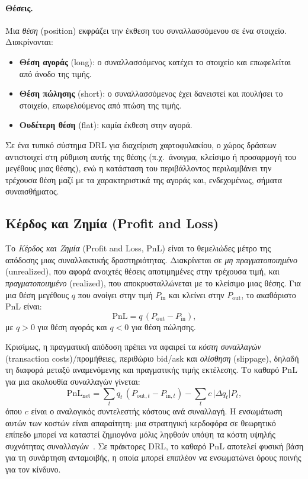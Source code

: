 \paragraph{Θέσεις.}
Μια \emph{θέση} (position) εκφράζει την έκθεση του
συναλλασσόμενου σε ένα στοιχείο. Διακρίνονται:
\begin{itemize}
    \item \textbf{Θέση αγοράς} (long): ο
    συναλλασσόμενος κατέχει το στοιχείο και επωφελείται από άνοδο της τιμής.
    \item \textbf{Θέση πώλησης} (short): ο
    συναλλασσόμενος έχει δανειστεί και πουλήσει το στοιχείο, επωφελούμενος από
    πτώση της τιμής.
    \item \textbf{Ουδέτερη θέση} (flat): καμία
    έκθεση στην αγορά.
\end{itemize}
Σε ένα τυπικό σύστημα DRL για διαχείριση χαρτοφυλακίου, ο χώρος δράσεων
αντιστοιχεί στη ρύθμιση αυτής της θέσης (π.χ.\ άνοιγμα, κλείσιμο ή προσαρμογή
του μεγέθους μιας θέσης), ενώ η κατάσταση του περιβάλλοντος περιλαμβάνει την
τρέχουσα θέση μαζί με τα χαρακτηριστικά της αγοράς και, ενδεχομένως, σήματα
συναισθήματος.


\subsection{Κέρδος και Ζημία (Profit and Loss)}
\label{subsec:pnl}

Το \emph{Κέρδος και Ζημία} (Profit and Loss, PnL)
είναι το θεμελιώδες μέτρο της απόδοσης μιας συναλλακτικής δραστηριότητας.
Διακρίνεται σε \emph{μη πραγματοποιημένο}
(unrealized), που αφορά ανοιχτές θέσεις
αποτιμημένες στην τρέχουσα τιμή, και \emph{πραγματοποιημένο}
(realized), που αποκρυσταλλώνεται με το κλείσιμο
μιας θέσης. Για μια θέση μεγέθους $q$ που ανοίγει στην τιμή $P_{\mathrm{in}}$
και κλείνει στην $P_{\mathrm{out}}$, το ακαθάριστο PnL είναι:
\begin{equation}
    \mathrm{PnL} = q\,(P_{\mathrm{out}} - P_{\mathrm{in}}),
    \label{eq:pnl-gross}
\end{equation}
με $q > 0$ για θέση αγοράς και $q < 0$ για θέση πώλησης.

Κρισίμως, η πραγματική απόδοση πρέπει να αφαιρεί τα \emph{κόστη συναλλαγών}
(transaction costs)/προμήθειες, περιθώριο
bid/ask και \emph{ολίσθηση}
(slippage), δηλαδή τη διαφορά μεταξύ αναμενόμενης
και πραγματικής τιμής εκτέλεσης. Το καθαρό PnL για μια ακολουθία συναλλαγών
γίνεται:
\begin{equation}
    \mathrm{PnL}_{\mathrm{net}}
    = \sum_{t} q_t\,(P_{\mathrm{out},t} - P_{\mathrm{in},t})
    - \sum_{t} c\,\lvert \Delta q_t \rvert P_t,
    \label{eq:pnl-net}
\end{equation}
όπου $c$ είναι ο αναλογικός συντελεστής κόστους ανά συναλλαγή. Η ενσωμάτωση
αυτών των κοστών είναι απαραίτητη: μια στρατηγική κερδοφόρα σε θεωρητικό
επίπεδο μπορεί να καταστεί ζημιογόνα μόλις ληφθούν υπόψη τα κόστη υψηλής
συχνότητας συναλλαγών~\cite{hambly2023rlfinance}. Σε πράκτορες DRL, το καθαρό PnL αποτελεί φυσική βάση για τη συνάρτηση
ανταμοιβής, η οποία μπορεί επιπλέον να ενσωματώνει όρους ποινής για
τον κίνδυνο.


